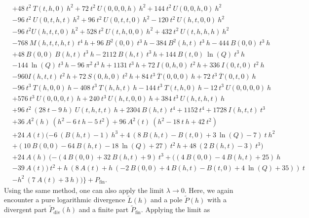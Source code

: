 \documentclass[a4paper,12pt]{book}
\begin{document}
\begin{align}
   \nonumber 
   &+48 \>t^2 \>T(t,h,0) \>h^2+72\>
t^2\> U(0,0,0,h)\> h^2+144 \>t^2
 \>  U(0,0,h,0)\> h^2\\
 \nonumber
 &-96\>t^2\> U(0,t,h,t)\> h^2+96 \>t^2 \> U(0,t,t,0)\> h^2-120\>
t^2\> U(h,t,0,0)\> h^2\\
\nonumber
&-96\> t^2
   U(h,t,t,0)\> h^2+528\> t^2\> U(t,h,0,0) \>h^2+432\> t^2\> U(t,h,h,h)
\>h^2\\
\nonumber
&-768\> M(h,t,t,h,t) \>t^4 \>h+96\>
   B^2(0,0)\> t^3\> h-384\> B^2(h,t) \>t^3 \>h-444\> B(0,0)\> t^3 \>h\\
   \nonumber
   &+48 \>B(0,0)\> B(h,t)\> t^3\> h-2112\>
   B(h,t)\> t^3\> h+144\> B(t,0)\> \ln(Q)\> t^3 \>h\\
   \nonumber
   &-144 \>\ln(Q)\> t^3 \>h-96 \>\pi^2\> t^3\>
h+1131\> t^3\> h+72\> I(0,h,0)\> t^2
  \> h+336\> I(0,t,0)\> t^2\> h\\
  \nonumber
  &-960 I(h,t,t)\> t^2\> h+72\> S(0,h,0)\> t^2\> h+84\>
t^3\> \overline{T}(0,0,0)\> h+72\> t^3\>
   \overline{T}(0,t,0)\> h\\
   \nonumber&
   -96\> t^3\> T(h,0,0)\> h-408\> t^3\> T(h,h,t) \>h-144\> t^3\> T(t,h,0) \>h-12\> t^3
\>   U(0,0,0,0)\> h\\
   \nonumber&
   +576\> t^3\> U(0,0,0,t)\> h+240\> t^3\> U(h,t,0,0)\> h+384\> t^3\> U(h,t,h,t)\> h\\
   \nonumber&
   +96\> t^2\> (28\> t-9\>
   h) \> U(t,h,t,t)\> h+2304\> B(h,t)\> t^4+1152\> t^4+1728\> I(h,t,t)\>
t^3\\
   \nonumber&
   +36\> A^2(h)\> (h^2-6\> t \>h-5
   \>t^2)+96\> A^2(t) \>(h^2-18\> t \>h+42\> t^2)\\
   \nonumber&
   +24\> A(t)
(-6\> (B(h,t)-1)\> h^3+4\>
   (8\> B(h,t)-B(t,0)+3\> \ln(Q)-7)\> t \>h^2\\
   \nonumber&
   +(10\> B(0,0)-64\> B(h,t)-18\>
\ln(Q)+27)\> t^2\> h+48\> (2
 \>  B(h,t)-3)\> t^3)\\
   \nonumber&
   +24\> A(h)\> (-(4\> B(0,0)+32\>
B(h,t)+9)\> t^3+((4 \>B(0,0)-4\>
   B(h,t)+25)\> h\\
   \nonumber&
   -39\> A(t))\> t^2+h \>(8\> A(t)+h\> (-2\> B(0,0)+4
\>B(h,t)-B(t,0)+4\> \ln(Q)+35))\>
   t\\
&-h^2\> (7\> A(t)+3\> h))\}+P_\text{fin}.
\end{align}
Using the same method, one can also apply the limit $\lambda \rightarrow 0$. Here, we again encounter a pure logarithmic divergence $\widetilde{L}(h)$ and a pole $\widetilde{P}(h)$ with a divergent part $\widetilde{P}_\text{div}(h)$ and a finite part $\widetilde{P}_\text{fin}$. Applying the limit as 
\end{document}
